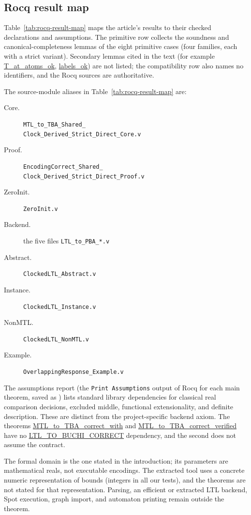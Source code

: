 \documentclass[manuscript]{acmart}
\newcommand{\Rocqid}[1]{\url{#1}}
\begin{document}
\subsection{Rocq result map}
\label{subsec:rocq-result-map}
Table~\ref{tab:rocq-result-map} maps the article's results to their checked
declarations and assumptions. The primitive row collects the soundness and canonical-completeness
lemmas of the eight primitive cases (four families, each with a strict variant).
Secondary lemmas cited in the text (for example \Rocqid{T_at_atoms_ok},
\Rocqid{labels_ok}) are not listed; the compatibility row also names no
identifiers, and the Rocq sources are authoritative.

The source-module aliases in Table~\ref{tab:rocq-result-map} are:
\begin{description}
\item[Core.] \texttt{MTL\_to\_TBA\_Shared\_}\\
\texttt{Clock\_Derived\_Strict\_Direct\_Core.v}
\item[Proof.] \texttt{EncodingCorrect\_Shared\_}\\
\texttt{Clock\_Derived\_Strict\_Direct\_Proof.v}
\item[ZeroInit.] \texttt{ZeroInit.v}
\item[Backend.] the five files \texttt{LTL\_to\_PBA\_*.v}
\item[Abstract.] \texttt{ClockedLTL\_Abstract.v}
\item[Instance.] \texttt{ClockedLTL\_Instance.v}
\item[NonMTL.] \texttt{ClockedLTL\_NonMTL.v}
\item[Example.] \texttt{OverlappingResponse\_Example.v}

\end{description}

The assumptions report (the \texttt{Print Assumptions} output of Rocq for each
main theorem, saved as ) lists standard library
dependencies for classical real comparison
decisions, excluded middle, functional extensionality, and definite description.
These are distinct from the project-specific backend axiom. The theorems
\Rocqid{MTL_to_TBA_correct_with} and \Rocqid{MTL_to_TBA_correct_verified} have
no \Rocqid{LTL_TO_BUCHI_CORRECT} dependency, and the second does not assume the
contract. 

The formal domain is the one stated in the introduction; its
parameters are mathematical reals, not executable encodings. The extracted tool
uses a concrete numeric representation of bounds (integers in all our tests),
and the theorems are not stated for that representation. Parsing, an efficient or extracted
LTL backend, Spot execution, graph import, and automaton
printing remain outside the theorem. 
\end{document}
